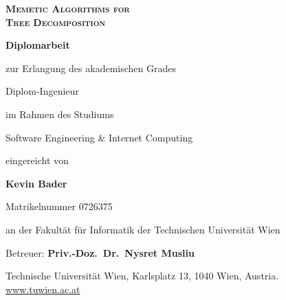 \documentclass[thesis.tex]{subfiles}
\begin{document}
{

\vspace{3\baselineskip}
\begin{center}
   \bfseries\scshape\HUGE
   Memetic Algorithms for\\
   Tree Decomposition
\end{center}

\bigskip
\begin{center}
   \bfseries\LARGE
   Diplomarbeit
\end{center}

\smallskip
\begin{center}
   zur Erlangung des akademischen Grades
\end{center}

\smallskip
\begin{center}
   \LARGE
   Diplom-Ingenieur
\end{center}

\smallskip
\begin{center}
   im Rahmen des Studiums
\end{center}

\smallskip
\begin{center}
   \LARGE
   Software Engineering \& Internet Computing
\end{center}

\smallskip
\begin{center}
   eingereicht von
\end{center}

\smallskip
\begin{center}
   \LARGE\bfseries
   Kevin Bader
\end{center}
\begin{center}
   Matrikelnummer 0726375
\end{center}

\smallskip
\begin{center}
   an der Fakultät für Informatik der Technischen Universität Wien
\end{center}

\smallskip
\begin{center}
   Betreuer: \textbf{Priv.-Doz.\ Dr.\ Nysret Musliu}
\end{center}

\vspace{4\baselineskip}
\footnotesize
\begin{center}
   Technische Universität Wien, Karlsplatz 13, 1040 Wien, Austria. \href{www.tuwien.ac.at}{www.tuwien.ac.at}
\end{center}

}

\restoregeometry
\end{document}
